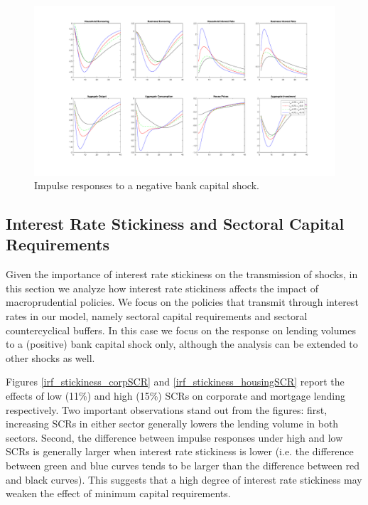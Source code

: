 \documentclass[12pt]{article}
\numberwithin{equation}{section}
\begin{document}
\begin{figure}[H]
\centering
\caption{Impulse responses to a negative bank capital shock.}
\label{irf_stickiness_ECAB}
\includegraphics[scale=0.4]{stickinessNegativeShocksECAB.pdf}
\end{figure}




\subsection{Interest Rate Stickiness and Sectoral Capital Requirements}

Given the importance of interest rate stickiness on the transmission of shocks, in this section we analyze how interest rate stickiness affects the impact of macroprudential policies. We focus on the policies that transmit through interest rates in our model, namely sectoral capital requirements and sectoral countercyclical buffers. %
In this case we focus on the response on lending volumes to a (positive) bank capital shock only, although the analysis can be extended to other shocks as well. 

Figures \ref{irf_stickiness_corpSCR} and \ref{irf_stickiness_housingSCR} report the effects of low (11\%) and high (15\%) SCRs on corporate and mortgage lending respectively. Two important observations stand out from the figures: first, increasing SCRs in either sector generally lowers the lending volume in both sectors. Second, the difference between impulse responses under high and low SCRs is generally larger when interest rate stickiness is lower (i.e. the difference between green and blue curves tends to be larger than the difference between red and black curves). This suggests that a high degree of interest rate stickiness may weaken the effect of minimum capital requirements. 
\end{document}
